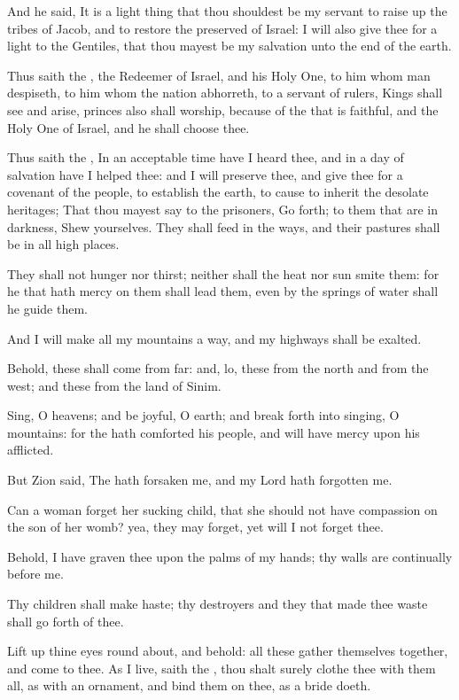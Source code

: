 \verse And he said, It is a light thing that thou shouldest be my servant to raise up the tribes of Jacob, and to restore the preserved of Israel: I will also give thee for a light to the Gentiles, that thou mayest be my salvation unto the end of the earth.

\verse Thus saith the \LORD, the Redeemer of Israel, and his Holy One, to him whom man despiseth, to him whom the nation abhorreth, to a servant of rulers, Kings shall see and arise, princes also shall worship, because of the \LORD that is faithful, and the Holy One of Israel, and he shall choose thee.

\verse Thus saith the \LORD, In an acceptable time have I heard thee, and in a day of salvation have I helped thee: and I will preserve thee, and give thee for a covenant of the people, to establish the earth, to cause to inherit the desolate heritages; \verse That thou mayest say to the prisoners, Go forth; to them that are in darkness, Shew yourselves. They shall feed in the ways, and their pastures shall be in all high places.

\verse They shall not hunger nor thirst; neither shall the heat nor sun smite them: for he that hath mercy on them shall lead them, even by the springs of water shall he guide them.

\verse And I will make all my mountains a way, and my highways shall be exalted.

\verse Behold, these shall come from far: and, lo, these from the north and from the west; and these from the land of Sinim.

\verse Sing, O heavens; and be joyful, O earth; and break forth into singing, O mountains: for the \LORD hath comforted his people, and will have mercy upon his afflicted.

\verse But Zion said, The \LORD hath forsaken me, and my Lord hath forgotten me.

\verse Can a woman forget her sucking child, that she should not have compassion on the son of her womb? yea, they may forget, yet will I not forget thee.

\verse Behold, I have graven thee upon the palms of my hands; thy walls are continually before me.

\verse Thy children shall make haste; thy destroyers and they that made thee waste shall go forth of thee.

\verse Lift up thine eyes round about, and behold: all these gather themselves together, and come to thee. As I live, saith the \LORD, thou shalt surely clothe thee with them all, as with an ornament, and bind them on thee, as a bride doeth.

